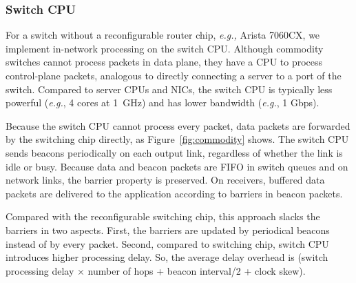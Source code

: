 \subsubsection{Switch CPU}
\label{sec:commodity}

For a switch without a reconfigurable router chip, \textit{e.g.,} Arista 7060CX, we implement in-network processing on the switch CPU.
Although commodity switches cannot process packets in data plane, they have a CPU to process control-plane packets, analogous to directly connecting a server to a port of the switch.
Compared to server CPUs and NICs, the switch CPU is typically less powerful (\textit{e.g.}, 4 cores at 1~GHz) and has lower bandwidth (\textit{e.g.}, 1 Gbps).

Because the switch CPU cannot process every packet, data packets are forwarded by the switching chip directly, as Figure~\ref{fig:commodity} shows.
The switch CPU sends beacons periodically on each output link, regardless of whether the link is idle or busy.
Because data and beacon packets are FIFO in switch queues and on network links, the barrier property is preserved. On receivers, buffered data packets are delivered to the application according to barriers in beacon packets.

Compared with the reconfigurable switching chip, this approach slacks the barriers in two aspects.
First, the barriers are updated by periodical beacons instead of by every packet.
Second, compared to switching chip, switch CPU introduces higher processing delay.
So, the average delay overhead is (switch processing delay $\times$ number of hops + beacon interval/2 + clock skew).


